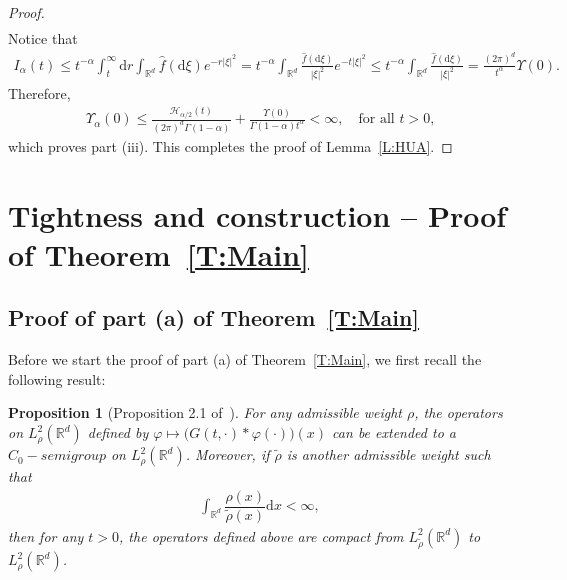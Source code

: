 \documentclass[a4paper,11pt]{article}%
\theoremstyle{plain}
\newtheorem{proposition}[theorem]{Proposition}
\theoremstyle{definition}
\numberwithin{equation}{section}
\newcommand{\R}{\mathbb{R}}
\newcommand{\ud}{\ensuremath{\mathrm{d}}}
\begin{document}
\begin{proof}
\begin{align*}
  \end{align*}
  Notice that
  \begin{align*}
    I_\alpha(t)
    \le t^{-\alpha} \int_t^\infty \ud r \int_{\R^d} \widehat{f}(\ud\xi)e^{-r|\xi|^2}
    =   t^{-\alpha} \int_{\R^d} \frac{\widehat{f}(\ud\xi)}{|\xi|^2} e^{-t|\xi|^2}
    \le t^{-\alpha} \int_{\R^d} \frac{\widehat{f}(\ud\xi)}{|\xi|^2}
    =   \frac{\left(2\pi\right)^d}{t^{\alpha}} \Upsilon(0).
  \end{align*}
  Therefore,
  \begin{align*}
    \Upsilon_{\alpha}(0) \le \frac{\mathcal{H}_{\alpha/2}(t)}{(2\pi)^d\Gamma(1-\alpha)} +
    \frac{\Upsilon(0)}{\Gamma\left(1-\alpha\right)t^{\alpha}} <\infty, \quad \text{for all $t>0$,}
  \end{align*}
  which proves part (iii). This completes the proof of Lemma~\ref{L:HUA}.
\end{proof}


\section{Tightness and construction -- Proof of Theorem~\ref{T:Main}}\label{S:mainproof}
\subsection{Proof of part (a) of Theorem~\ref{T:Main}}

Before we start the proof of part (a) of Theorem~\ref{T:Main}, we first recall the following result:

\begin{proposition}[Proposition 2.1 of~\cite{tessitore.zabczyk:98:invariant}]\label{P:weight}
  For any admissible weight $\rho$, the operators on $L^2_\rho(\R^d)$ defined by $\varphi \mapsto
  \big(G(t,\cdot)*\varphi(\cdot)\big)(x)$ can be extended to a $C_0-semigroup$ on $L^2_\rho(\R^d)$.
  Moreover, if $\tilde{\rho}$ is another admissible weight such that
	\begin{align*}
	\int_{\R^d}\dfrac{\rho(x)}{\tilde{\rho}(x)}\ud x < \infty,
	\end{align*}
	then for any $t>0$, the operators defined above are compact from $L^2_{\tilde{\rho}}(\R^d)$ to
	$L^2_\rho(\R^d)$.
\end{proposition}
\end{document}
